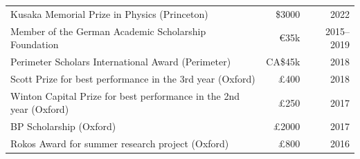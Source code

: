 \begin{tabularx}{\linewidth}{Xrr}
Kusaka Memorial Prize in Physics (Princeton) & \$3000 & 2022 \\
Member of the German Academic Scholarship Foundation & €35k & 2015--2019 \\
Perimeter Scholars International Award (Perimeter) & CA\$45k & 2018 \\
Scott Prize for best performance in the 3rd year (Oxford) & £400 & 2018  \\
Winton Capital Prize for best performance in the 2nd year (Oxford) & £250 & 2017 \\
BP Scholarship (Oxford) & £2000 & 2017 \\
Rokos Award for summer research project (Oxford) & £800 & 2016 \\
\end{tabularx}

